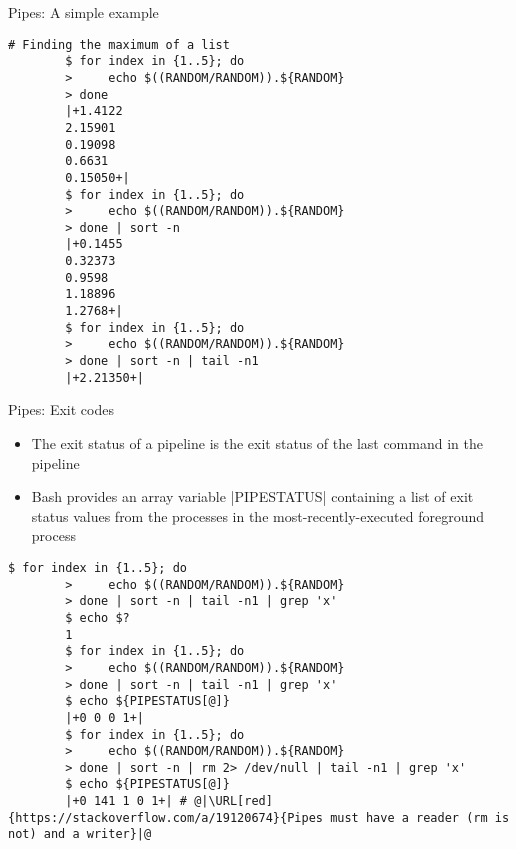 \begin{frame}[fragile]{Pipes: A simple example}
    \begin{lstlisting}[style=MyBash, aboveskip=0mm]
        # Finding the maximum of a list
        $ for index in {1..5}; do
        >     echo $((RANDOM/RANDOM)).${RANDOM}
        > done
        |+1.4122
        2.15901
        0.19098
        0.6631
        0.15050+|
        $ for index in {1..5}; do
        >     echo $((RANDOM/RANDOM)).${RANDOM}
        > done | sort -n
        |+0.1455
        0.32373
        0.9598
        1.18896
        1.2768+|
        $ for index in {1..5}; do
        >     echo $((RANDOM/RANDOM)).${RANDOM}
        > done | sort -n | tail -n1
        |+2.21350+|
    \end{lstlisting}
\end{frame}
\begin{frame}[fragile]{Pipes: Exit codes}
    \vspace{-3mm}
    \begin{itemize}
        \item The exit status of a pipeline is the exit status of the last command in the pipeline
        \item Bash provides an array variable \bash|PIPESTATUS| containing a list of exit status values from the processes in the most-recently-executed foreground process
    \end{itemize}
    \begin{lstlisting}[style=MyBash, aboveskip=3mm]
        $ for index in {1..5}; do
        >     echo $((RANDOM/RANDOM)).${RANDOM}
        > done | sort -n | tail -n1 | grep 'x'
        $ echo $?
        1
        $ for index in {1..5}; do
        >     echo $((RANDOM/RANDOM)).${RANDOM}
        > done | sort -n | tail -n1 | grep 'x'
        $ echo ${PIPESTATUS[@]}
        |+0 0 0 1+|
        $ for index in {1..5}; do
        >     echo $((RANDOM/RANDOM)).${RANDOM}
        > done | sort -n | rm 2> /dev/null | tail -n1 | grep 'x'
        $ echo ${PIPESTATUS[@]}
        |+0 141 1 0 1+| # @|\URL[red]{https://stackoverflow.com/a/19120674}{Pipes must have a reader (rm is not) and a writer}|@
    \end{lstlisting}
\end{frame}
